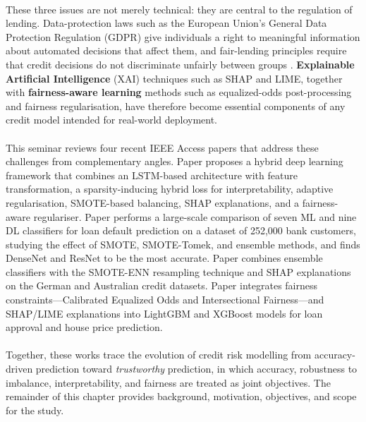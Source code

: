 \documentclass[12pt,a4paper,final]{extreport}
\begin{document}
\paragraph{} These three issues are not merely technical: they are central to the regulation of lending. Data-protection laws such as the European Union's General Data Protection Regulation (GDPR) give individuals a right to meaningful information about automated decisions that affect them, and fair-lending principles require that credit decisions do not discriminate unfairly between groups \cite{p4}. \textbf{Explainable Artificial Intelligence} (XAI) techniques such as SHAP and LIME, together with \textbf{fairness-aware learning} methods such as equalized-odds post-processing and fairness regularisation, have therefore become essential components of any credit model intended for real-world deployment.

\paragraph{} This seminar reviews four recent IEEE Access papers that address these challenges from complementary angles. Paper \cite{p1} proposes a hybrid deep learning framework that combines an LSTM-based architecture with feature transformation, a sparsity-inducing hybrid loss for interpretability, adaptive regularisation, SMOTE-based balancing, SHAP explanations, and a fairness-aware regulariser. Paper \cite{p2} performs a large-scale comparison of seven ML and nine DL classifiers for loan default prediction on a dataset of 252{,}000 bank customers, studying the effect of SMOTE, SMOTE-Tomek, and ensemble methods, and finds DenseNet and ResNet to be the most accurate. Paper \cite{p3} combines ensemble classifiers with the SMOTE-ENN resampling technique and SHAP explanations on the German and Australian credit datasets. Paper \cite{p4} integrates fairness constraints---Calibrated Equalized Odds and Intersectional Fairness---and SHAP/LIME explanations into LightGBM and XGBoost models for loan approval and house price prediction.

\paragraph{} Together, these works trace the evolution of credit risk modelling from accuracy-driven prediction toward \emph{trustworthy} prediction, in which accuracy, robustness to imbalance, interpretability, and fairness are treated as joint objectives. The remainder of this chapter provides background, motivation, objectives, and scope for the study.
\end{document}
